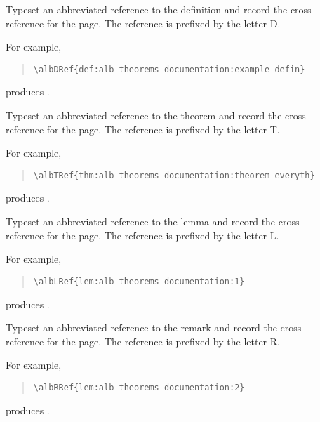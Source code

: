 \documentclass[11pt,a4paper,oneside,titlepage]{alb-corp}
\begin{document}
\begin{description}
\item[] Typeset an abbreviated
  reference to the  definition and record the cross
  reference for the page.  The reference is prefixed by the letter D.

  For example,
  \begin{quote}
\begin{verbatim}
\albDRef{def:alb-theorems-documentation:example-defin}
\end{verbatim}
  \end{quote}
  produces .

\item[] Typeset an abbreviated
  reference to the  theorem and record the cross
  reference for the page.  The reference is prefixed by the letter T.

  For example,
  \begin{quote}
\begin{verbatim}
\albTRef{thm:alb-theorems-documentation:theorem-everyth}
\end{verbatim}
  \end{quote}
  produces .

\item[] Typeset an abbreviated
  reference to the  lemma and record the cross
  reference for the page.  The reference is prefixed by the letter L.

  For example,
  \begin{quote}
\begin{verbatim}
\albLRef{lem:alb-theorems-documentation:1}
\end{verbatim}
  \end{quote}
  produces .

\item[] Typeset an abbreviated
  reference to the  remark and record the cross
  reference for the page.  The reference is prefixed by the letter R.

  For example,
  \begin{quote}
\begin{verbatim}
\albRRef{lem:alb-theorems-documentation:2}
\end{verbatim}
  \end{quote}
  produces .


\end{description}
\end{document}
